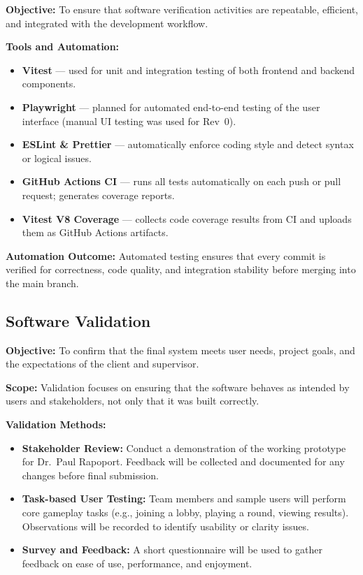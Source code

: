 \documentclass[12pt, titlepage]{article}
\begin{document}
\noindent\textbf{Objective:}  
To ensure that software verification activities are repeatable, efficient, and integrated with the development workflow.

\noindent\textbf{Tools and Automation:}
\begin{itemize}
    \item \textbf{Vitest} --- used for unit and integration testing of both frontend and backend components.
    \item \textbf{Playwright} --- planned for automated end-to-end testing of the user interface (manual UI testing was used for Rev~0).
    \item \textbf{ESLint \& Prettier} --- automatically enforce coding style and detect syntax or logical issues.
    \item \textbf{GitHub Actions CI} --- runs all tests automatically on each push or pull request; generates coverage reports.
    \item \textbf{Vitest V8 Coverage} --- collects code coverage results from CI and uploads them as GitHub Actions artifacts.
\end{itemize}

\noindent\textbf{Automation Outcome:}  
Automated testing ensures that every commit is verified for correctness, code quality, and integration stability before merging into the main branch.

\subsection{Software Validation}

\noindent\textbf{Objective:}  
To confirm that the final system meets user needs, project goals, and the expectations of the client and supervisor.

\noindent\textbf{Scope:}  
Validation focuses on ensuring that the software behaves as intended by users and stakeholders, not only that it was built correctly.

\noindent\textbf{Validation Methods:}
\begin{itemize}
    \item \textbf{Stakeholder Review:}  
    Conduct a demonstration of the working prototype for Dr.\ Paul Rapoport.  
    Feedback will be collected and documented for any changes before final submission.
    
    \item \textbf{Task-based User Testing:}  
    Team members and sample users will perform core gameplay tasks (e.g., joining a lobby, playing a round, viewing results).  
    Observations will be recorded to identify usability or clarity issues.

    \item \textbf{Survey and Feedback:}  
    A short questionnaire will be used to gather feedback on ease of use, performance, and enjoyment.
\end{itemize}
\end{document}
